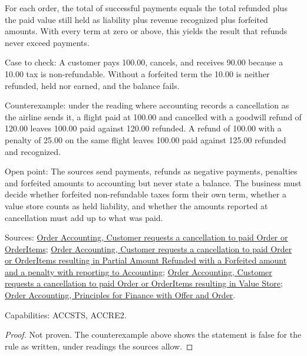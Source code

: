 \begin{theorem}
  \label{thm:accounting-order-money-balance}
  For each order, the total of successful payments equals the total refunded
  plus the paid value still held as liability plus revenue recognized plus
  forfeited amounts. With every term at zero or above, this yields the
  result that refunds never exceed payments.

  Case to check: A customer pays 100.00, cancels, and receives 90.00 because
  a 10.00 tax is non-refundable. Without a forfeited term the 10.00 is
  neither refunded, held nor earned, and the balance fails.

  Counterexample: under the reading where accounting records a
  cancellation as the airline sends it, a flight paid at 100.00 and
  cancelled with a goodwill refund of 120.00 leaves 100.00 paid against
  120.00 refunded.  A refund of 100.00 with a penalty of 25.00 on the same
  flight leaves 100.00 paid against 125.00 refunded and recognized.

  Open point: The sources send payments, refunds as negative payments,
  penalties and forfeited amounts to accounting but never state a balance.
  The business must decide whether forfeited non-refundable taxes form their
  own term, whether a value store counts as held liability, and whether the
  amounts reported at cancellation must add up to what was paid.

  Sources: \href{https://standards.atlassian.net/wiki/spaces/OA/pages/844333086}{Order Accounting, Customer requests a cancellation to paid Order or OrderItems};
  \href{https://standards.atlassian.net/wiki/spaces/OA/pages/844333143}{Order Accounting, Customer requests a cancellation to paid Order or OrderItems resulting in Partial Amount Refunded with a Forfeited amount and a penalty with reporting to Accounting};
  \href{https://standards.atlassian.net/wiki/spaces/OA/pages/844169268}{Order Accounting, Customer requests a cancellation to paid Order or OrderItems resulting in Value Store};
  \href{https://standards.atlassian.net/wiki/spaces/OA/pages/617185366}{Order Accounting, Principles for Finance with Offer and Order}.

  Capabilities: ACCSTS, ACCRE2.
\end{theorem}
\begin{proof}
  Not proven.  The counterexample above shows the statement is false for
  the rule as written, under readings the sources allow.
\end{proof}

